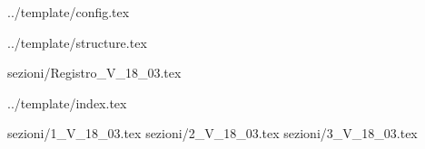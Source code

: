  {../template/config.tex}


\def\DOCUMENTO{Verbale esterno 18/03/2016}
\def\VERSIONE{1.0.0}

\def\DESCRIZIONE{<Info documento>}

\def\REDATTORE {Gino Zaidan}
\def\VERIFICATORE {Alberto Andriolo\\ & Riccardo Rizzo}
\def\RESPONSABILE {Enrico Chiara}

\def\USO {Esterno}

\def\DISTRIBUZIONE {\GRUPPO{}\\ & \COMMITTENTE{}\\}

\def\DESCRIZIONE {Verbale di incontro tra il gruppo \GRUPPO\ e il Proponente \PROPONENTE\ per il progetto \PROGETTO}


\def\INDICE	{true}
\def\TABELLE {false}
\def\FIGURE {false}


 {../template/structure.tex}

 {sezioni/Registro_V_18_03.tex}

 {../template/index.tex}

 {sezioni/1_V_18_03.tex}
 {sezioni/2_V_18_03.tex}
 {sezioni/3_V_18_03.tex}





